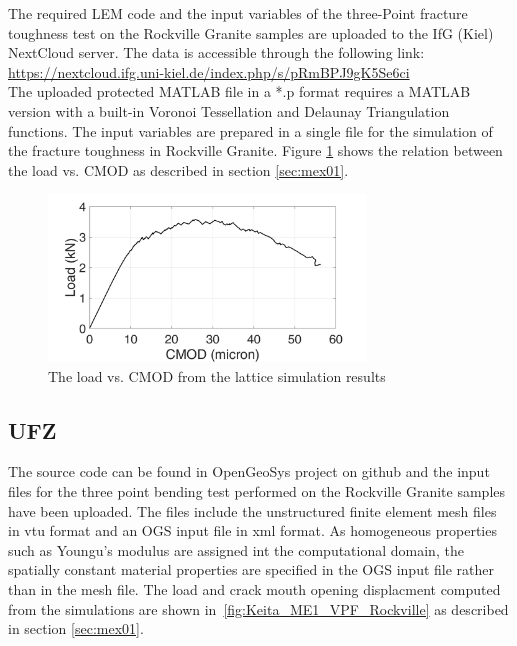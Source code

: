 The required LEM code and the input variables of the three-Point fracture toughness test on the Rockville Granite samples are uploaded to the IfG (Kiel) NextCloud server. The data is accessible through the following link:\\
\hyperlink{https://nextcloud.ifg.uni-kiel.de/index.php/s/pRmBPJ9gK5Se6ci}{https://nextcloud.ifg.uni-kiel.de/index.php/s/pRmBPJ9gK5Se6ci}\\

The uploaded protected MATLAB file in a *.p format requires a MATLAB version with a built-in Voronoi Tessellation and Delaunay Triangulation functions. The input variables are prepared in a single file for the simulation of the fracture toughness in Rockville Granite. Figure \ref{fig:Amir_ME1_LEM_Displacement_Crystalline_Data} shows the relation between the load vs. CMOD as described in section \ref {sec:mex01}.

\begin{figure}[!ht]
\centering
\includegraphics[width=0.75\textwidth]{figures/Amir_ME1_LEM_Displacement_Crystalline_Data.png}
\caption{The load vs. CMOD from the lattice simulation results}
\label{fig:Amir_ME1_LEM_Displacement_Crystalline_Data}
\end{figure}


\subsection*{UFZ}
The source code can be found in OpenGeoSys project on github and  the input files for the three point bending test performed on the Rockville Granite samples have been uploaded.
The files include the unstructured finite element mesh files in vtu format and an OGS input file in xml format.
As homogeneous properties such as Youngu's modulus are assigned int the computational domain, the spatially constant material properties are specified in the OGS input file rather than in the mesh file.
The load and crack mouth opening displacment computed from the simulations are shown in~\ref{fig:Keita_ME1_VPF_Rockville} as described in section \ref {sec:mex01}.

